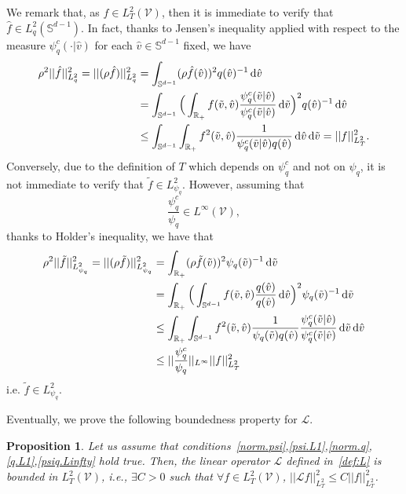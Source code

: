 \documentclass[a4paper]{article}
\theoremstyle{Theorem}\newtheorem{proposition}{Proposition}[section]
\theoremstyle{Remark}\newtheorem{remark}{Remark}[section]
\theoremstyle{Theorem}\newtheorem{theorem}{Theorem}[section]
\newcommand{\R}{\mathbb{R}}
\newcommand{\hv}{\hat{v}}
\newcommand{\tv}{\tilde{v}}
\newcommand{\hf}{\hat{f}}
\newcommand{\tf}{\tilde{f}}
\newcommand{\intS}{\int_{\mathbb{S}^{d-1}}}
\newcommand{\intR}{\int_{\R_+}}
\begin{document}
We remark that, as $f \in L^2_T(\mathcal{V})$, then it is immediate to verify that $\hf \in L^2_q(\mathbb{S}^{d-1})$. In fact, thanks to Jensen's inequality applied with respect to the measure $\psi_q^c(\cdot|\hv)$ for each $\hv \in\mathbb{S}^{d-1}$ fixed, we have
\begin{equation}\label{norm.hf}
\begin{split}
   \rho^2 ||\hf||^2_{L^2_q}= ||(\rho \hf)||^2_{L^2_q} &=\intS (\rho \hf(\hv))^2 q(\hv)^{-1} \, {\rm d} \hv\\
   &=\intS \Big(\intR f(\tv,\hv)\dfrac{\psi_q^c(\tv|\hv)}{\psi_q^c(\tv|\hv)} \, {\rm d} \tv\Big)^2 q(\hv)^{-1} \, {\rm d} \hv\\
   &\le \intS\intR f^2(\tv,\hv) \dfrac{1}{\psi_q^c(\tv|\hv)q(\hv)} \, {\rm d} \hv \, {\rm d} \tv  = ||f||^2_{L^2_T}. 
   \end{split}
\end{equation}
Conversely, due to the definition of $T$ which depends on $\psi_q^c$ and not on $\psi_q$, it is not immediate to verify that $\tf \in L^2_{\psi_q}$. However, assuming that
\begin{equation}\label{psiq.Linfty}
    \dfrac{\psi_q^c}{\psi_q} \in L^\infty(\mathcal{V}),
\end{equation}
thanks to Holder's inequality, we have that 
\begin{equation}\label{norm.tf}
\begin{split}
   \rho^2 ||\tf||^2_{L^2_{\psi_q}}= ||(\rho \tf)||^2_{L^2_{\psi_q}} &=\intR (\rho \tf(\tv))^2 \psi_q(\tv)^{-1} \, {\rm d} \tv \\
   &=\intR \Big(\intS f(\tv,\hv)\dfrac{q(\hv)}{q(\hv)} \, {\rm d} \hv\Big)^2  \psi_q(\tv)^{-1}\, {\rm d} \tv\\
   &\le \intR\intS f^2(\tv,\hv) \dfrac{1}{\psi_q(\tv)q(\hv)} \dfrac{\psi_q^c(\tv|\hv)}{\psi_q^c(\tv|\hv)} \, {\rm d} \tv \, {\rm d} \hv \\
   &\le ||\dfrac{\psi_q^c}{\psi_q}||_{L^\infty} ||f||^2_{L^2_T}
   \end{split} 
\end{equation}
i.e. $\tf \in L^2_{\psi_q}$.

Eventually, we prove the following boundedness property for $\mathcal{L}$.
\begin{proposition} Let us assume that conditions~\eqref{norm.psi},\eqref{psi.L1},\eqref{norm.q},\eqref{q.L1},\eqref{psiq.Linfty} hold true. Then, the linear operator $\mathcal{L}$ defined in~\eqref{def:L} is bounded in $L^2_T(\mathcal{V})$, i.e., $\exists C>0$ such that $\forall f \in L^2_T(\mathcal{V})$, $||\mathcal{L}f||^2_{L^2_T} \le C ||f||^2_{L^2_T}$.
\end{proposition}
\end{document}
